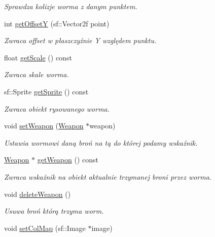 \begin{DoxyCompactItemize}
\begin{DoxyCompactList}\small\item\em Sprawdza kolizje worma z danym punktem. \end{DoxyCompactList}\item 
int \mbox{\hyperlink{class_worm_a5a9fb6f1859a7b5cf6c447ea3ae0c1e5}{get\+OffsetY}} (sf\+::\+Vector2f point)
\begin{DoxyCompactList}\small\item\em Zwraca offset w płaszczyźnie Y względem punktu. \end{DoxyCompactList}\item 
float \mbox{\hyperlink{class_worm_a72cf5070503bcba6423773de3367cdfd}{get\+Scale}} () const
\begin{DoxyCompactList}\small\item\em Zwraca skale worma. \end{DoxyCompactList}\item 
sf\+::\+Sprite \mbox{\hyperlink{class_worm_a9b314b9a4bb91830aac7f616ef071c07}{get\+Sprite}} () const
\begin{DoxyCompactList}\small\item\em Zwraca obiekt rysowanego worma. \end{DoxyCompactList}\item 
void \mbox{\hyperlink{class_worm_a9f2a337a176e5186c7227880337c98c3}{set\+Weapon}} (\mbox{\hyperlink{class_weapon}{Weapon}} $\ast$weapon)
\begin{DoxyCompactList}\small\item\em Ustawia wormowi daną broń na tą do której podamy wskaźnik. \end{DoxyCompactList}\item 
\mbox{\hyperlink{class_weapon}{Weapon}} $\ast$ \mbox{\hyperlink{class_worm_a42f56e4d14502d65c500fb20bd31a561}{get\+Weapon}} () const
\begin{DoxyCompactList}\small\item\em Zwraca wskaźnik na obiekt aktualnie trzymanej broni przez worma. \end{DoxyCompactList}\item 
void \mbox{\hyperlink{class_worm_adbede9b2b03f764f71629a299aec5299}{delete\+Weapon}} ()
\begin{DoxyCompactList}\small\item\em Usuwa broń którą trzyma worm. \end{DoxyCompactList}\item 
void \mbox{\hyperlink{class_worm_af851e558c46b33b245b96a43bb2e5c56}{set\+Col\+Map}} (sf\+::\+Image $\ast$image)

\end{DoxyCompactItemize}
